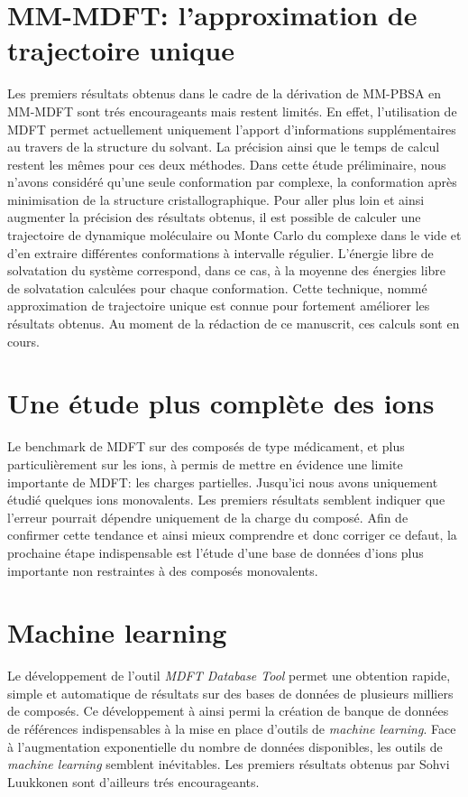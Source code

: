 \section{MM-MDFT: l'approximation de trajectoire unique }
Les premiers résultats obtenus dans le cadre de la dérivation de MM-PBSA en MM-MDFT sont trés encourageants mais restent limités. En effet, l'utilisation de MDFT permet actuellement uniquement l'apport d'informations supplémentaires au travers de la structure du solvant. La précision ainsi que le temps de calcul restent les mêmes pour ces deux méthodes. Dans cette étude préliminaire, nous n'avons considéré qu'une seule conformation par complexe, la conformation après minimisation de la structure cristallographique. Pour aller plus loin et ainsi augmenter la précision des résultats obtenus, il est possible de calculer une trajectoire de dynamique moléculaire ou Monte Carlo du complexe dans le vide et d'en extraire différentes conformations à intervalle régulier. L'énergie libre de solvatation du système correspond, dans ce cas, à la moyenne des énergies libre de solvatation calculées pour chaque conformation. Cette technique, nommé approximation de trajectoire unique est connue pour fortement améliorer les résultats obtenus. Au moment de la rédaction de ce manuscrit, ces calculs sont en cours.

\section{Une étude plus complète des ions}
Le benchmark de MDFT sur des composés de type médicament, et plus particulièrement sur les ions, à permis de mettre en évidence une limite importante de MDFT: les charges partielles. Jusqu'ici nous avons uniquement étudié quelques ions monovalents. Les premiers résultats semblent indiquer que l'erreur pourrait dépendre uniquement de la charge du composé. Afin de confirmer cette tendance et ainsi mieux comprendre et donc corriger ce defaut, la prochaine étape indispensable est l'étude d'une base de données d'ions plus importante non restraintes à des composés monovalents.

\section{Machine learning}
Le développement de l'outil \textit{MDFT Database Tool} permet une obtention rapide, simple et automatique de résultats sur des bases de données de plusieurs milliers de composés. Ce développement à ainsi permi la création de banque de données de références indispensables à la mise en place d'outils de \textit{machine learning}. Face à l'augmentation exponentielle du nombre de données disponibles, les outils de \textit{machine learning} semblent inévitables. Les premiers résultats obtenus par Sohvi Luukkonen sont d'ailleurs trés encourageants.

